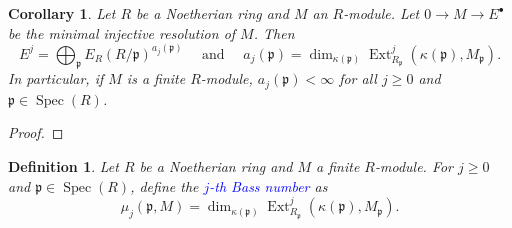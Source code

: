 \documentclass[10pt]{article}
\theoremstyle{thmstyle}
\theoremstyle{defstyle}
\newtheorem{definition}[theorem]{Definition}
\newtheorem{corollary}[theorem]{Corollary}
\newcommand{\Spec}{\operatorname{Spec}}
\newcommand{\frakp}{\mathfrak{p}} %
\newcommand{\define}[1]{\textcolor{blue}{\textit{#1}}}
\renewcommand{\ge}{\geqslant}
\newcommand{\Ext}{\operatorname{Ext}}
\begin{document}
\begin{corollary}
    Let $R$ be a Noetherian ring and $M$ an $R$-module. Let $0\to M\to E^\bullet$ be \emph{the} minimal injective resolution of $M$. Then 
    \begin{equation*}
        E^j = \bigoplus_{\frakp}E_R\left(R/\frakp\right)^{a_j(\frakp)}\quad\text{ and }\quad a_j(\frakp) = \dim_{\kappa(\frakp)} \Ext^j_{R_\frakp}\left(\kappa(\frakp), M_\frakp\right).
    \end{equation*}
    In particular, if $M$ is a finite $R$-module, $a_j(\frakp) < \infty$ for all $j\ge 0$ and $\frakp\in\Spec(R)$.
\end{corollary}
\begin{proof}
\end{proof}

\begin{definition}
    Let $R$ be a Noetherian ring and $M$ a finite $R$-module. For $j\ge 0$ and $\frakp\in\Spec(R)$, define the \define{$j$-th Bass number} as 
    \begin{equation*}
        \mu_j\left(\frakp, M\right) = \dim_{\kappa(\frakp)}\Ext_{R_\frakp}^j\left(\kappa(\frakp), M_\frakp\right).
    \end{equation*}
\end{definition}
\end{document}
